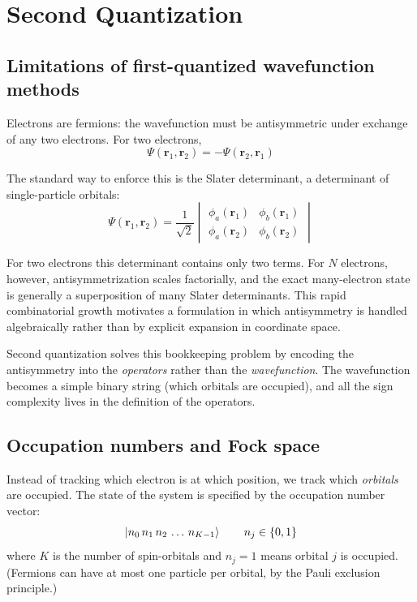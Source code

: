 \documentclass[aps,prb,preprint,longbibliography,nofootinbib]{revtex4-2}
\begin{document}
\section{Second Quantization}
\label{sec:second-quantization}

\subsection{Limitations of first-quantized wavefunction methods}

Electrons are fermions: the wavefunction must be antisymmetric under
exchange of any two electrons.  For two electrons,
\begin{equation}
\Psi(\mathbf{r}_1, \mathbf{r}_2) = -\Psi(\mathbf{r}_2, \mathbf{r}_1)
\end{equation}

The standard way to enforce this is the Slater determinant, a
determinant of single-particle orbitals:
\begin{equation}
\Psi(\mathbf{r}_1, \mathbf{r}_2) = \frac{1}{\sqrt{2}}
\begin{vmatrix}
\phi_a(\mathbf{r}_1) & \phi_b(\mathbf{r}_1) \\
\phi_a(\mathbf{r}_2) & \phi_b(\mathbf{r}_2)
\end{vmatrix}
\end{equation}

For two electrons this determinant contains only two terms.  For $N$
electrons, however, antisymmetrization scales factorially, and the
exact many-electron state is generally a superposition of many Slater
determinants.  This rapid combinatorial growth motivates a formulation
in which antisymmetry is handled algebraically rather than by explicit
expansion in coordinate space.

Second quantization solves this bookkeeping problem by encoding the
antisymmetry into the \emph{operators} rather than the
\emph{wavefunction}.  The wavefunction becomes a simple binary string
(which orbitals are occupied), and all the sign complexity lives in the
definition of the operators.

\subsection{Occupation numbers and Fock space}

Instead of tracking which electron is at which position, we track which
\emph{orbitals} are occupied.  The state of the system is specified by
the occupation number vector:
\begin{equation}
\ket{n_0\, n_1\, n_2\, \ldots\, n_{K-1}} \qquad n_j \in \{0, 1\}
\end{equation}
where $K$ is the number of spin-orbitals and $n_j = 1$ means orbital $j$
is occupied.  (Fermions can have at most one particle per orbital, by
the Pauli exclusion principle.)
\end{document}

